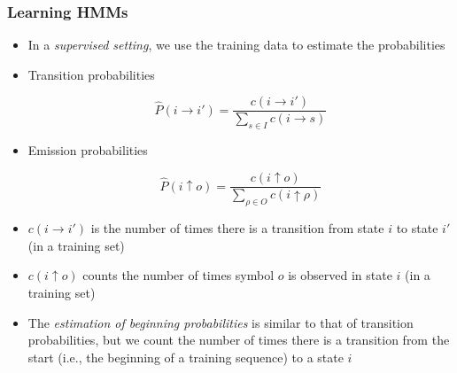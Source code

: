 \documentclass{beamer}
\begin{document}
\begin{frame} \frametitle{Learning HMMs}
  
  \begin{itemize}
  \item In a \emph{supervised setting}, we use the training data to estimate
      the probabilities
  \item Transition probabilities
    \begin{block}{} \scriptsize
      \begin{displaymath}
        \hat{P}(i \rightarrow i') = \frac{c(i \rightarrow i')}{\sum_{s \in I}c(i \rightarrow s)}
      \end{displaymath}
    \end{block}

  \item Emission probabilities
    \begin{block}{} \scriptsize
      \begin{displaymath}
        \hat{P}(i \uparrow o) = \frac{c(i \uparrow o)}{\sum_{\rho \in O}c(i \uparrow \rho)}
      \end{displaymath}
    \end{block}
  \end{itemize}

  \vspace{1.0ex}

  { \scriptsize
  \begin{itemize}
  \item $c(i \rightarrow i')$ is the number of times there is a transition from state $i$ to state $i'$ (in a training set)
  \item $c(i \uparrow o)$ counts the number of times symbol $o$ is observed in state $i$ (in a training set)
  \item The \emph{estimation of beginning probabilities} is similar to that of transition probabilities, but we count the number of times there is a transition from the start (i.e., the beginning of a training sequence) to a state $i$
  \end{itemize}
  }
\end{frame}

\end{document}
